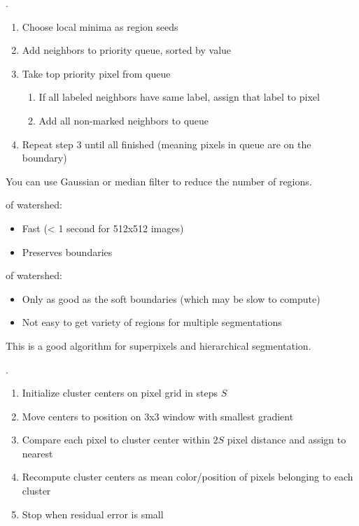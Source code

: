 \documentclass{article}
\begin{document}
\begin{definition}
  .  
  \begin{enumerate}
    \item Choose local minima as region seeds 
    \item Add neighbors to priority queue, sorted by value 
    \item Take top priority pixel from queue 
      \begin{enumerate}
        \item If all labeled neighbors have same label, assign that label to pixel 
        \item Add all non-marked neighbors to queue 
      \end{enumerate}
    \item Repeat step 3 until all finished (meaning pixels in queue are on the boundary)
  \end{enumerate}
\end{definition}

\begin{remark}
  You can use Gaussian or median filter to reduce the number of regions. 
\end{remark}

 of watershed: 
\begin{itemize}
  \item Fast (< 1 second for 512x512 images)
  \item Preserves boundaries 
\end{itemize}

 of watershed: 
\begin{itemize}
  \item Only as good as the soft boundaries (which may be slow to compute) 
  \item Not easy to get variety of regions for multiple segmentations
\end{itemize}

This is a good algorithm for superpixels and hierarchical segmentation. \\

\begin{definition}[SLIC]
  . 
  \begin{enumerate}
    \item Initialize cluster centers on pixel grid in steps $S$ 
    \item Move centers to position on 3x3 window with smallest gradient 
    \item Compare each pixel to cluster center within $2S$ pixel distance and assign to nearest 
    \item Recompute cluster centers as mean color/position of pixels belonging to each cluster 
    \item Stop when residual error is small 
  \end{enumerate}
\end{definition}
\end{document}
